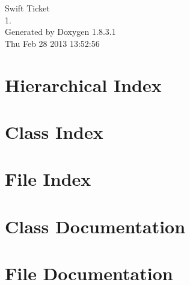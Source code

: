 \documentclass{book}
\begin{document}
\hypersetup{pageanchor=false,citecolor=blue}
\begin{titlepage}
\vspace*{7cm}
\begin{center}
{\Large Swift Ticket \\[1ex]\large 1. }\\
\vspace*{1cm}
{\large Generated by Doxygen 1.8.3.1}\\
\vspace*{0.5cm}
{\small Thu Feb 28 2013 13:52:56}\\
\end{center}
\end{titlepage}
\clearemptydoublepage
{}
\tableofcontents
\clearemptydoublepage
{}
\hypersetup{pageanchor=true,citecolor=blue}
\chapter{Hierarchical Index}

\chapter{Class Index}

\chapter{File Index}

\chapter{Class Documentation}
















\chapter{File Documentation}

















\printindex
\end{document}
